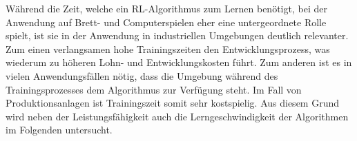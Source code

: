 Während die Zeit, welche ein RL-Algorithmus zum Lernen benötigt, bei der Anwendung auf Brett- und Computerspielen 
eher eine untergeordnete Rolle spielt, ist sie in der Anwendung in industriellen Umgebungen deutlich relevanter.
Zum einen verlangsamen hohe Trainingszeiten den Entwicklungsprozess, was wiederum zu höheren Lohn- und Entwicklungskosten führt. 
Zum anderen ist es in vielen Anwendungsfällen nötig, dass die Umgebung während des Trainingsprozesses dem Algorithmus zur Verfügung steht. 
Im Fall von Produktionsanlagen ist Trainingszeit somit sehr kostspielig.
Aus diesem Grund wird neben der Leistungsfähigkeit auch die Lerngeschwindigkeit der Algorithmen im Folgenden untersucht.


\newpage
